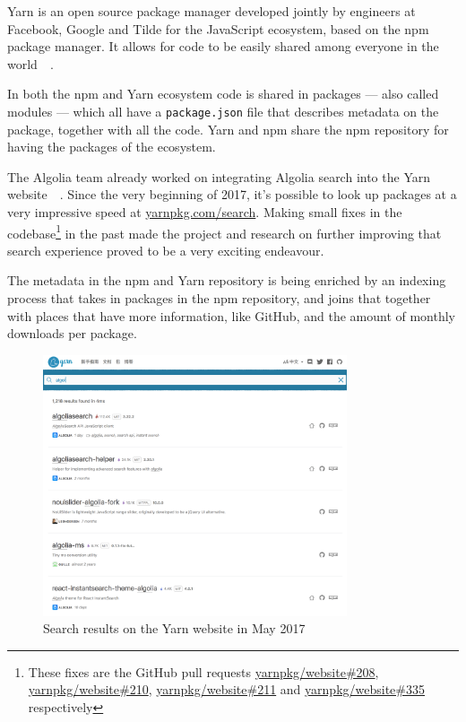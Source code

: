 Yarn is an open source package manager developed jointly by engineers at Facebook, Google and Tilde for the JavaScript ecosystem, based on the npm package manager. It allows for code to be easily shared among everyone in the world~\cite{yarn-site}~.

In both the npm and Yarn ecosystem code is shared in packages --- also called modules --- which all have a {\tt package.json} file that describes metadata on the package, together with all the code. Yarn and npm share the npm repository for having the packages of the ecosystem.

The Algolia team already worked on integrating Algolia search into the Yarn website~\cite{yarn-pr-add-algolia}~. Since the very beginning of 2017, it’s possible to look up packages at a very impressive speed at \href{https://yarnpkg.com/search}{yarnpkg.com/search}. Making small fixes in the codebase\footnote{These fixes are the GitHub pull requests \href{https://github.com/yarnpkg/website/pulls/208}{yarnpkg/website\#208}, \href{https://github.com/yarnpkg/website/pulls/210}{yarnpkg/website\#210}, \href{https://github.com/yarnpkg/website/pulls211}{yarnpkg/website\#211} and \href{https://github.com/yarnpkg/website/pulls/335}{yarnpkg/website\#335} respectively} in the past made the project and research on further improving that search experience proved to be a very exciting endeavour.

The metadata in the npm and Yarn repository is being enriched by an indexing process\cite{npm-search} that takes in packages in the npm repository, and joins that together with places that have more information, like GitHub, and the amount of monthly downloads per package.

\begin{figure}[H]
  \centering
  \includegraphics[width=0.8\textwidth]{../assets/yarn-search.png}
  \caption{Search results on the Yarn website in May 2017}
  \label{figure:yarn-search}
\end{figure}

